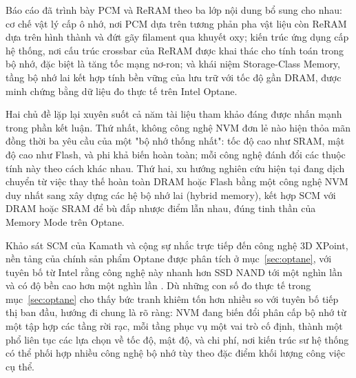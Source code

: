 \documentclass[12pt,a4paper]{article}
\begin{document}
Báo cáo đã trình bày PCM và ReRAM theo ba lớp nội dung bổ sung cho nhau: cơ chế vật lý cấp ô nhớ, nơi PCM dựa trên tương phản pha vật liệu còn ReRAM dựa trên hình thành và đứt gãy filament qua khuyết oxy; kiến trúc ứng dụng cấp hệ thống, nơi cấu trúc crossbar của ReRAM được khai thác cho tính toán trong bộ nhớ, đặc biệt là tăng tốc mạng nơ-ron; và khái niệm Storage-Class Memory, tầng bộ nhớ lai kết hợp tính bền vững của lưu trữ với tốc độ gần DRAM, được minh chứng bằng dữ liệu đo thực tế trên Intel Optane.

Hai chủ đề lặp lại xuyên suốt cả năm tài liệu tham khảo đáng được nhấn mạnh trong phần kết luận. Thứ nhất, không công nghệ NVM đơn lẻ nào hiện thỏa mãn đồng thời ba yêu cầu của một "bộ nhớ thống nhất": tốc độ cao như SRAM, mật độ cao như Flash, và phi khả biến hoàn toàn; mỗi công nghệ đánh đổi các thuộc tính này theo cách khác nhau. Thứ hai, xu hướng nghiên cứu hiện tại đang dịch chuyển từ việc thay thế hoàn toàn DRAM hoặc Flash bằng một công nghệ NVM duy nhất sang xây dựng các hệ bộ nhớ lai (hybrid memory), kết hợp SCM với DRAM hoặc SRAM để bù đắp nhược điểm lẫn nhau, đúng tinh thần của Memory Mode trên Optane.

Khảo sát SCM của Kamath và cộng sự nhắc trực tiếp đến công nghệ 3D XPoint, nền tảng của chính sản phẩm Optane được phân tích ở mục~\ref{sec:optane}, với tuyên bố từ Intel rằng công nghệ này nhanh hơn SSD NAND tới một nghìn lần và có độ bền cao hơn một nghìn lần \cite{kamath2019}. Dù những con số đo thực tế trong mục~\ref{sec:optane} cho thấy bức tranh khiêm tốn hơn nhiều so với tuyên bố tiếp thị ban đầu, hướng đi chung là rõ ràng: NVM đang biến đổi phân cấp bộ nhớ từ một tập hợp các tầng rời rạc, mỗi tầng phục vụ một vai trò cố định, thành một phổ liên tục các lựa chọn về tốc độ, mật độ, và chi phí, nơi kiến trúc sư hệ thống có thể phối hợp nhiều công nghệ bộ nhớ tùy theo đặc điểm khối lượng công việc cụ thể.

\renewcommand{\refname}{Tài liệu tham khảo}
\end{document}
